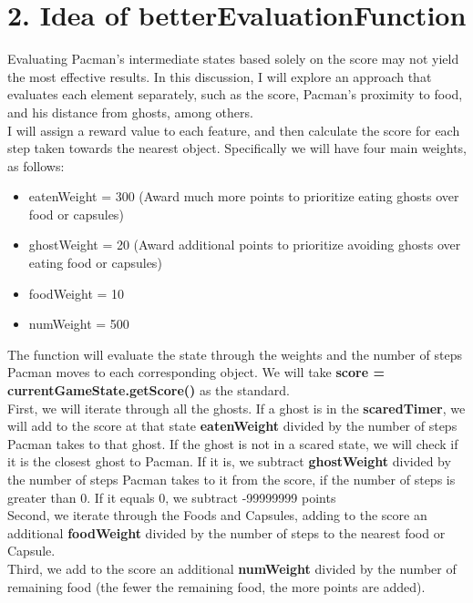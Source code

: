 \documentclass[english, a4paper,12pt]{article}
\begin{document}
\section*{2. Idea of betterEvaluationFunction}
\normalsize\hspace*{7mm}Evaluating Pacman’s intermediate states based solely on the score may not yield the most effective results. In this discussion, I will explore an approach that evaluates each element separately, such as the score, Pacman’s proximity to food, and his distance from ghosts, among others.
\vspace*{3mm}\\
\normalsize\hspace*{7mm}I will assign a reward value to each feature, and then calculate the score for each step taken towards the nearest object. Specifically we will have four main weights, as follows:
\begin{itemize}
\item eatenWeight = 300 (Award much more points to prioritize eating ghosts over food or capsules)
\item ghostWeight = 20 (Award additional points to prioritize avoiding ghosts over eating food or capsules)
\item foodWeight = 10 
 \item numWeight = 500 
\end{itemize}
\normalsize\hspace*{7mm}The function will evaluate the state through the weights and the number of steps Pacman moves to each corresponding object. We will take \textbf{score = currentGameState.getScore()} as the standard.
\\
\normalsize\hspace*{7mm}First, we will iterate through all the ghosts. If a ghost is in the \textbf{scaredTimer}, we will add to the score at that state \textbf{eatenWeight} divided by the number of steps Pacman takes to that ghost. If the ghost is not in a scared state, we will check if it is the closest ghost to Pacman. If it is, we subtract \textbf{ghostWeight} divided by the number of steps Pacman takes to it from the score, if the number of steps is greater than 0. If it equals 0, we subtract -99999999 points
\\
\hspace*{7mm}Second, we iterate through the Foods and Capsules, adding to the score an additional \textbf{foodWeight} divided by the number of steps to the nearest food or Capsule.
\\
\hspace*{7mm}Third, we add to the score an additional \textbf{numWeight} divided by the number of remaining food (the fewer the remaining food, the more points are added).
\end{document}
